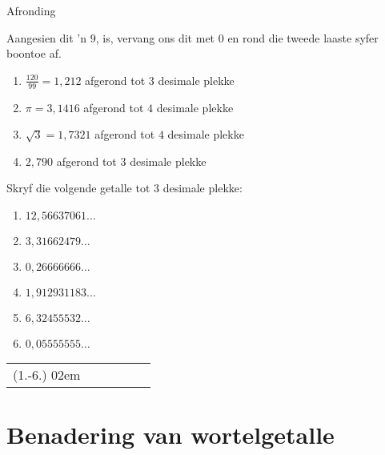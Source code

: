 \begin{wex}{Afronding}
{\begin{minipage}{0.8\textwidth}
\begin{enumerate}[itemsep=2pt, label=\textbf{\arabic*}. ]
\end{enumerate}
\vspace*{7pt}
\end{minipage}
\newline Aangesien dit ’n $9$, is, vervang ons dit met $0$ en
rond die tweede laaste syfer boontoe af.
\begin{minipage}{\textwidth}
\vspace*{7pt}
\begin{enumerate}[itemsep=2pt, label=\textbf{\arabic*}. ]
\item $\frac{120}{99}=1,212$ afgerond tot $3$ desimale plekke
\item $\pi =3,1416$  afgerond tot $4$ desimale plekke
\item $\sqrt{3}=1,7321$ afgerond tot $4$ desimale plekke
\item $2,790$ afgerond tot $3$ desimale plekke
\end{enumerate}
\end{minipage}
}  
\end{wex}


\begin{exercises}{}
{
Skryf die volgende getalle tot $3$ desimale plekke:
\begin{enumerate}[itemsep=5pt, label=\textbf{\arabic*}. ]
\item $12,56637061\ldots$ %
\item $3,31662479\ldots$ %
\item $0,26666666\ldots$ %
\item $1,912931183\ldots$ %
\item $6,32455532\ldots$ %
\item $0,05555555\ldots$ %
\end{enumerate}

\par \practiceinfo
\par \begin{tabular}[h]{cccccc}
(1.-6.)	02em	&
	\\ %
\end{tabular}
}
\end{exercises}


\section{Benadering van wortelgetalle}

